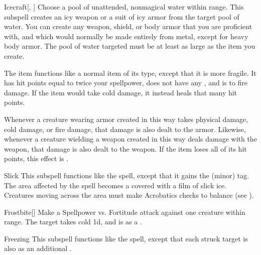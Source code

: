 \begin{ability}[\nth{2}]{Icecraft}[, ]
Choose a pool of unattended, nonmagical water within \rngclose range.
This subspell creates an icy weapon or a suit of icy armor from the target pool of water.
You can create any weapon, shield, or body armor that you are proficient with, and which would normally be made entirely from metal, except for heavy body armor.
The pool of water targeted must be at least as large as the item you create.

The item functions like a normal item of its type, except that it is more fragile.
It has hit points equal to twice your spellpower, does not have any , and is  to fire damage.
If the item would take cold damage, it instead heals that many hit points.

Whenever a creature wearing armor created in this way takes physical damage, cold damage, or fire damage, that damage is also dealt to the armor.
Likewise, whenever a creature wielding a weapon created in this way deals damage with the weapon, that damage is also dealt to the weapon.
If the item loses all of its hit points, this effect is .
\end{ability}
\vspace{0.25em}


\begin{ability}[\nth{2}]{Slick}
This subspell functions like the  spell, except that it gains the  (minor) tag.
The area affected by the spell becomes a  covered with a film of slick ice.
Creatures moving across the area must make Acrobatics checks to balance (see ).
\end{ability}
\vspace{0.25em}


\begin{ability}[\nth{3}]{Frostbite}[]
Make a Spellpower vs. Fortitude attack against one creature within \rngmed range.
\hit The target takes cold  \plus1d, and is  as a .
\end{ability}
\vspace{0.25em}


\begin{ability}[\nth{4}]{Freezing}
This subspell functions like the  spell, except that each struck target is also  as an additional .
\end{ability}
\vspace{0.25em}


